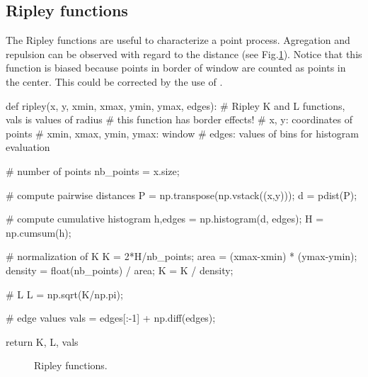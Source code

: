 \subsection{Ripley functions}
The Ripley functions are useful to characterize a point process. Agregation and repulsion can be observed with regard to the distance (see Fig.\ref{fig:point_process_generation:python:ripley}). Notice that this function is biased because points in border of window are counted as points in the center. This could be corrected by the use of .

\begin{python}
def ripley(x, y, xmin, xmax, ymin, ymax, edges):
    # Ripley K and L functions, vals is values of radius
    # this function has border effects!
    # x, y: coordinates of points
    # xmin, xmax, ymin, ymax: window
    # edges: values of bins for histogram evaluation
    
    # number of points    
    nb_points = x.size;
    
    # compute pairwise distances
    P = np.transpose(np.vstack((x,y)));
    d =  pdist(P);
    
    # compute cumulative histogram
    h,edges = np.histogram(d, edges);
    H = np.cumsum(h);
    
    # normalization of K    
    K = 2*H/nb_points;
    area = (xmax-xmin) * (ymax-ymin);
    density = float(nb_points) / area;
    K = K / density;
    
    # L
    L = np.sqrt(K/np.pi);
    
    # edge values
    vals = edges[:-1] + np.diff(edges);
    
    return K, L, vals
\end{python}

\begin{figure}[H]
 \centering\caption{Ripley functions.}%
 \hfill
 \label{fig:point_process_generation:python:ripley}%
\end{figure} 

